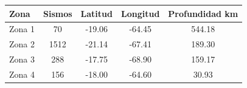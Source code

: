 \begin{tabular}{lcccc}
\toprule
Zona & Sismos & Latitud & Longitud & Profundidad km \\
\midrule
Zona 1 & 70 & -19.06 & -64.45 & 544.18 \\
Zona 2 & 1512 & -21.14 & -67.41 & 189.30 \\
Zona 3 & 288 & -17.75 & -68.90 & 159.17 \\
Zona 4 & 156 & -18.00 & -64.60 & 30.93 \\
\bottomrule
\end{tabular}